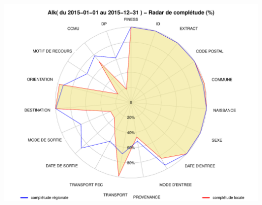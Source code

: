 \documentclass[]{article}
\begin{document}
\includegraphics{completude_files/figure-latex/finess-8.pdf}
\end{document}
